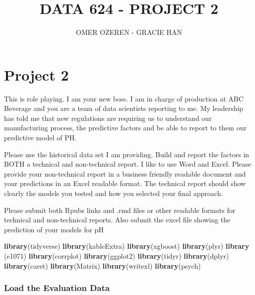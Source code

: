 \documentclass[]{article}
\title{DATA 624 - PROJECT 2}
\author{OMER OZEREN - GRACIE HAN}
\date{}
\newenvironment{Shaded}{\begin{snugshade}}{\end{snugshade}}
\newcommand{\KeywordTok}[1]{\textcolor[rgb]{0.13,0.29,0.53}{\textbf{#1}}}
\newcommand{\NormalTok}[1]{#1}
\begin{document}
\maketitle

{
\setcounter{tocdepth}{3}
\tableofcontents
}
\section{Project 2}\label{project-2}

This is role playing. I am your new boss. I am in charge of production
at ABC Beverage and you are a team of data scientists reporting to me.
My leadership has told me that new regulations are requiring us to
understand our manufacturing process, the predictive factors and be able
to report to them our predictive model of PH.

Please use the historical data set I am providing. Build and report the
factors in BOTH a technical and non-technical report. I like to use Word
and Excel. Please provide your non-technical report in a business
friendly readable document and your predictions in an Excel readable
format. The technical report should show clearly the models you tested
and how you selected your final approach.

Please submit both Rpubs links and .rmd files or other readable formats
for technical and non-technical reports. Also submit the excel file
showing the prediction of your models for pH

\begin{Shaded}
\begin{Highlighting}[]
\KeywordTok{library}\NormalTok{(tidyverse)}
\KeywordTok{library}\NormalTok{(kableExtra)}
\KeywordTok{library}\NormalTok{(xgboost)}
\KeywordTok{library}\NormalTok{(plyr)}
\KeywordTok{library}\NormalTok{ (e1071)}
\KeywordTok{library}\NormalTok{(corrplot)}
\KeywordTok{library}\NormalTok{(ggplot2)}
\KeywordTok{library}\NormalTok{(tidyr)}
\KeywordTok{library}\NormalTok{(dplyr)}
\KeywordTok{library}\NormalTok{(caret)}
\KeywordTok{library}\NormalTok{(Matrix)}
\KeywordTok{library}\NormalTok{(writexl)}
\KeywordTok{library}\NormalTok{(psych)}
\end{Highlighting}
\end{Shaded}

\subsubsection{Load the Evaluation Data}\label{load-the-evaluation-data}
\end{document}
